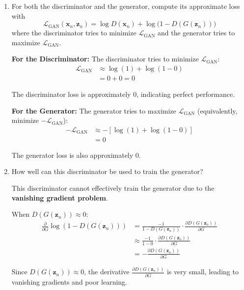 \documentclass[12pt,a4paper]{article}
\begin{document}
\begin{enumerate}
    \item For both the discriminator and the generator, compute its approximate loss with
    \begin{equation*}
        \mathcal{L}_{\mathrm{GAN}}(\mathbf{x}_n,\mathbf{z}_n)
        = \log D(\mathbf{x}_n) + \log\bigl(1 - D(G(\mathbf{z}_n))\bigr)
    \end{equation*}
    where the discriminator tries to minimize $\mathcal{L}_{\mathrm{GAN}}$ and the generator tries to maximize $\mathcal{L}_{\mathrm{GAN}}$.

    \textbf{For the Discriminator:}
The discriminator tries to minimize $\mathcal{L}_{\mathrm{GAN}}$:
\begin{align}
\mathcal{L}_{\mathrm{GAN}} &\approx \log(1) + \log(1 - 0) \\
&= 0 + 0 = 0
\end{align}

The discriminator loss is approximately 0, indicating perfect performance.

\textbf{For the Generator:}
The generator tries to maximize $\mathcal{L}_{\mathrm{GAN}}$ (equivalently, minimize $-\mathcal{L}_{\mathrm{GAN}}$):
\begin{align}
-\mathcal{L}_{\mathrm{GAN}} &\approx -[\log(1) + \log(1 - 0)] \\
&= 0
\end{align}

The generator loss is also approximately 0.
    \item How well can this discriminator be used to train the generator?

    This discriminator cannot effectively train the generator due to the \textbf{vanishing gradient problem}.

    When $D(G(\mathbf{z}_n)) \approx 0$:
    \begin{align}
    \frac{\partial}{\partial G} \log(1 - D(G(\mathbf{z}_n))) &= \frac{-1}{1 - D(G(\mathbf{z}_n))} \cdot \frac{\partial D(G(\mathbf{z}_n))}{\partial G} \\
    &\approx \frac{-1}{1 - 0} \cdot \frac{\partial D(G(\mathbf{z}_n))}{\partial G} \\
    &= -\frac{\partial D(G(\mathbf{z}_n))}{\partial G}
    \end{align}
    
    Since $D(G(\mathbf{z}_n)) \approx 0$, the derivative $\frac{\partial D(G(\mathbf{z}_n))}{\partial G}$ is very small, leading to vanishing gradients and poor learning.
    


\end{enumerate}
\end{document}
